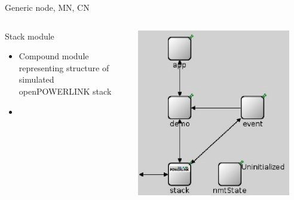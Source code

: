 \begin{frame}{Generic node, MN, CN}
    \begin{columns}
        \begin{column}{0.6\textwidth}
            \begin{block}{Stack module}
                \begin{itemize}
                    \item Compound module representing structure of simulated openPOWERLINK stack
                    \item 
                \end{itemize}
            \end{block}
        \end{column}
        \begin{column}{0.4\textwidth}
                \includegraphics[width=0.9\textwidth]{../../thesis/images/simulation_genericnode.eps}
        \end{column}
    \end{columns}
\end{frame}

